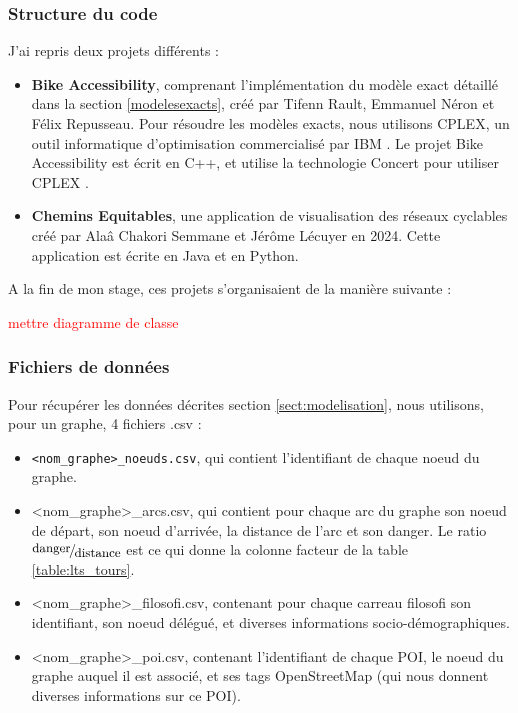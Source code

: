 \subsubsection{Structure du code}

J'ai repris deux projets différents :

\begin{itemize}
    \item \textbf{Bike Accessibility}, comprenant l'implémentation du modèle exact détaillé dans la section \ref{modelesexacts}, créé par Tifenn Rault, Emmanuel Néron et Félix Repusseau. Pour résoudre les modèles exacts, nous utilisons CPLEX, un outil informatique d'optimisation commercialisé par IBM \cite{cplex}. Le projet Bike Accessibility est écrit en C++, et utilise la technologie Concert pour utiliser CPLEX \cite{concert}.

    \item \textbf{Chemins Equitables}, une application de visualisation des réseaux cyclables créé par Alaâ Chakori Semmane et Jérôme Lécuyer en 2024. Cette application est écrite en Java et en Python.
\end{itemize}

A la fin de mon stage, ces projets s'organisaient de la manière suivante :

\textcolor{red}{mettre diagramme de classe}

\subsubsection{Fichiers de données}\label{sect:fichiersdonnees}

Pour récupérer les données décrites section \ref{sect:modelisation}, nous utilisons, pour un graphe, 4 fichiers .csv :

\begin{itemize}
    \item \verb|<nom_graphe>_noeuds.csv|, qui contient l'identifiant de chaque noeud du graphe.
    \item <nom\_graphe>\_arcs.csv, qui contient pour chaque arc du graphe son noeud de départ, son noeud d'arrivée, la distance de l'arc et son danger. Le ratio $\fFrac{\text{danger}}{\text{distance}}$ est ce qui donne la colonne facteur de la table \ref{table:lts_tours}.
    \item <nom\_graphe>\_filosofi.csv, contenant pour chaque carreau filosofi son identifiant, son noeud délégué, et diverses informations socio-démographiques.
    \item <nom\_graphe>\_poi.csv, contenant l'identifiant de chaque POI, le noeud du graphe auquel il est associé, et ses tags OpenStreetMap (qui nous donnent diverses informations sur ce POI). 
\end{itemize}

